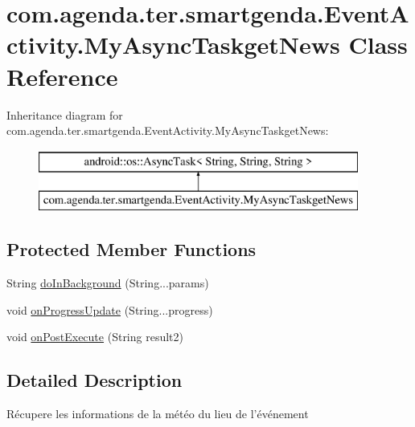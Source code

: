 \hypertarget{classcom_1_1agenda_1_1ter_1_1smartgenda_1_1_event_activity_1_1_my_async_taskget_news}{\section{com.\-agenda.\-ter.\-smartgenda.\-Event\-Activity.\-My\-Async\-Taskget\-News Class Reference}
\label{classcom_1_1agenda_1_1ter_1_1smartgenda_1_1_event_activity_1_1_my_async_taskget_news}
}
Inheritance diagram for com.\-agenda.\-ter.\-smartgenda.\-Event\-Activity.\-My\-Async\-Taskget\-News\-:\begin{figure}[H]
\begin{center}
\leavevmode
\includegraphics[height=2.000000cm]{classcom_1_1agenda_1_1ter_1_1smartgenda_1_1_event_activity_1_1_my_async_taskget_news}
\end{center}
\end{figure}
\subsection*{Protected Member Functions}
\begin{DoxyCompactItemize}
\item 
String \hyperlink{classcom_1_1agenda_1_1ter_1_1smartgenda_1_1_event_activity_1_1_my_async_taskget_news_a4bbc759f2038dcf80bf30f0af0248292}{do\-In\-Background} (String...\-params)
\item 
void \hyperlink{classcom_1_1agenda_1_1ter_1_1smartgenda_1_1_event_activity_1_1_my_async_taskget_news_af7e3184aaa33375d70d86035ea0bcac7}{on\-Progress\-Update} (String...\-progress)
\item 
void \hyperlink{classcom_1_1agenda_1_1ter_1_1smartgenda_1_1_event_activity_1_1_my_async_taskget_news_ace134e212a6ddd0c58709bcde54772aa}{on\-Post\-Execute} (String result2)
\end{DoxyCompactItemize}


\subsection{Detailed Description}
Récupere les informations de la météo du lieu de l'événement 

